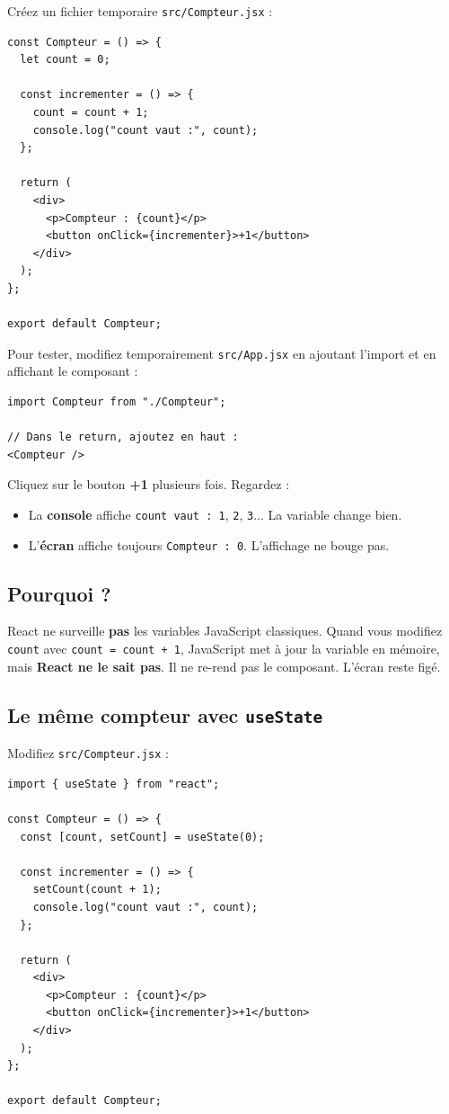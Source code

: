 \documentclass[11pt,a4paper]{article}
\begin{document}
Créez un fichier temporaire \texttt{src/Compteur.jsx} :

\begin{lstlisting}
const Compteur = () => {
  let count = 0;

  const incrementer = () => {
    count = count + 1;
    console.log("count vaut :", count);
  };

  return (
    <div>
      <p>Compteur : {count}</p>
      <button onClick={incrementer}>+1</button>
    </div>
  );
};

export default Compteur;
\end{lstlisting}

Pour tester, modifiez temporairement \texttt{src/App.jsx} en ajoutant l'import et en affichant le composant :

\begin{lstlisting}
import Compteur from "./Compteur";

// Dans le return, ajoutez en haut :
<Compteur />
\end{lstlisting}

Cliquez sur le bouton \textbf{+1} plusieurs fois. Regardez :
\begin{itemize}[nosep]
    \item La \textbf{console} affiche \texttt{count vaut : 1}, \texttt{2}, \texttt{3}... La variable change bien.
    \item L'\textbf{écran} affiche toujours \texttt{Compteur : 0}. L'affichage ne bouge pas.
\end{itemize}

\subsection{Pourquoi ?}

React ne surveille \textbf{pas} les variables JavaScript classiques. Quand vous modifiez \texttt{count} avec \texttt{count = count + 1}, JavaScript met à jour la variable en mémoire, mais \textbf{React ne le sait pas}. Il ne re-rend pas le composant. L'écran reste figé.

\subsection{Le même compteur avec \texttt{useState}}

Modifiez \texttt{src/Compteur.jsx} :

\begin{lstlisting}
import { useState } from "react";

const Compteur = () => {
  const [count, setCount] = useState(0);

  const incrementer = () => {
    setCount(count + 1);
    console.log("count vaut :", count);
  };

  return (
    <div>
      <p>Compteur : {count}</p>
      <button onClick={incrementer}>+1</button>
    </div>
  );
};

export default Compteur;
\end{lstlisting}
\end{document}
